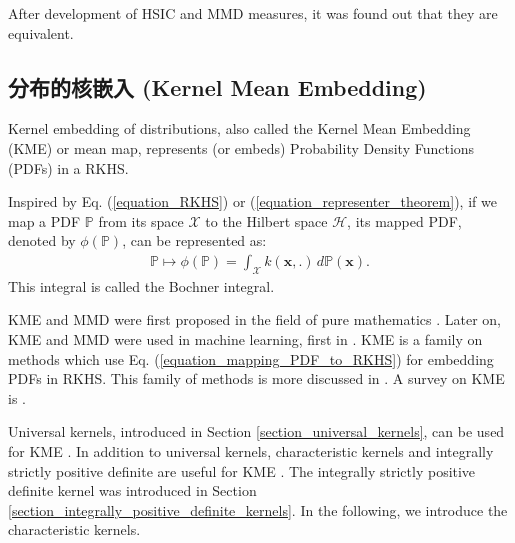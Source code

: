 \documentclass[lang=cn,10pt]{gorgeousnbook}
\numberwithin{equation}{section}%
\numberwithin{figure}{section}%
\begin{document}
\begin{remark}
After development of HSIC and MMD measures, it was found out that they are equivalent.
\end{remark}



\subsection{分布的核嵌入 (Kernel Mean Embedding)}\label{section_kernel_embedding_distributions}


\begin{definition}
Kernel embedding of distributions, also called the Kernel Mean Embedding (KME) or mean map, represents (or embeds) Probability Density Functions (PDFs) in a RKHS. 
\end{definition}

\begin{corollary}
Inspired by Eq. (\ref{equation_RKHS}) or (\ref{equation_representer_theorem}), if we map a PDF $\mathbb{P}$ from its space $\mathcal{X}$ to the Hilbert space $\mathcal{H}$, its mapped PDF, denoted by $\phi(\mathbb{P})$, can be represented as:
\begin{align}\label{equation_mapping_PDF_to_RKHS}
\mathbb{P} \mapsto \phi(\mathbb{P}) = \int_\mathcal{X} k(\boldsymbol{x}, .)\, d\mathbb{P}(\boldsymbol{x}).
\end{align}
This integral is called the Bochner integral.
\end{corollary}



KME and MMD were first proposed in the field of pure mathematics \cite{guilbart1978etude}.  
Later on, KME and MMD were used in machine learning, first in \cite{smola2007hilbert}.
KME is a family on methods which use Eq. (\ref{equation_mapping_PDF_to_RKHS}) for embedding PDFs in RKHS. This family of methods is more discussed in \cite{sriperumbudur2010hilbert}. 
A survey on KME is \cite{muandet2016kernel}. 

Universal kernels, introduced in Section \ref{section_universal_kernels}, can be used for KME \cite{sriperumbudur2011universality,simon2018kernel}. In addition to universal kernels, characteristic kernels and integrally strictly positive definite are useful for KME \cite{sriperumbudur2011universality,simon2018kernel}. 
The integrally strictly positive definite kernel was introduced in Section \ref{section_integrally_positive_definite_kernels}. In the following, we introduce the characteristic kernels. 
\end{document}

